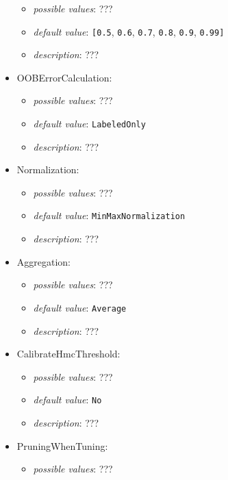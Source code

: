 \documentclass{article}
\begin{document}
\begin{itemize}
           \begin{itemize}
                \item \emph{possible values}: ???
                \item \emph{default value}: \texttt{[0.5}, \texttt{0.6}, \texttt{0.7}, \texttt{0.8}, \texttt{0.9}, \texttt{0.99]}
                \item \emph{description}: ???
           \end{itemize}
    \item OOBErrorCalculation:
           \begin{itemize}
                \item \emph{possible values}: ???
                \item \emph{default value}: \texttt{LabeledOnly}
                \item \emph{description}: ???
           \end{itemize}
    \item Normalization:
           \begin{itemize}
                \item \emph{possible values}: ???
                \item \emph{default value}: \texttt{MinMaxNormalization}
                \item \emph{description}: ???
           \end{itemize}
    \item Aggregation:
           \begin{itemize}
                \item \emph{possible values}: ???
                \item \emph{default value}: \texttt{Average}
                \item \emph{description}: ???
           \end{itemize}
    \item CalibrateHmcThreshold:
           \begin{itemize}
                \item \emph{possible values}: ???
                \item \emph{default value}: \texttt{No}
                \item \emph{description}: ???
           \end{itemize}
    \item PruningWhenTuning:
           \begin{itemize}
                \item \emph{possible values}: ???

\end{itemize}
\end{itemize}
\end{document}
